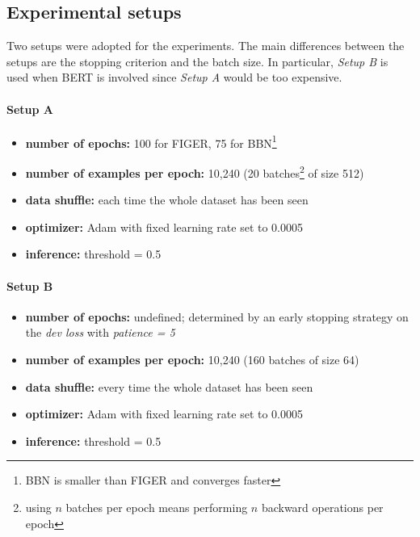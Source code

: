 \subsection{Experimental setups}
Two setups were adopted for the experiments. The main differences between the setups are the stopping criterion and the batch size. In particular, \textit{Setup B} is used when BERT is involved since \textit{Setup A} would be too expensive.
\paragraph{Setup A} 
\begin{itemize}
    \item \textbf{number of epochs:} 100 for FIGER, 75 for BBN\footnote{BBN is smaller than FIGER and converges faster}
    \item \textbf{number of examples per epoch:} 10,240 (20 batches\footnote{using $n$ batches per epoch means performing $n$ backward operations per epoch} of size 512)
    \item \textbf{data shuffle:} each time the whole dataset has been seen
    \item \textbf{optimizer:} Adam with fixed learning rate set to 0.0005
    \item \textbf{inference:} threshold = 0.5
\end{itemize}

\paragraph{Setup B} 
\begin{itemize}
    \item \textbf{number of epochs:} undefined; determined by an early stopping strategy on the \textit{dev loss} with \textit{patience = 5}
    \item \textbf{number of examples per epoch:} 10,240 (160 batches of size 64)
    \item \textbf{data shuffle:} every time the whole dataset has been seen
    \item \textbf{optimizer:} Adam with fixed learning rate set to 0.0005
     \item \textbf{inference:} threshold = 0.5
\end{itemize}

